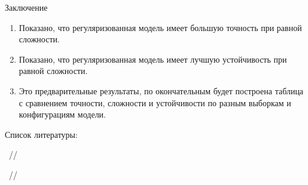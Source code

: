 \documentclass[9pt,pdf,hyperref={unicode}]{beamer}
\begin{document}
\begin{frame}{Заключение}

    \begin{enumerate}
           \item 
        Показано, что регуляризованная модель имеет большую точность при равной сложности.
        \item 
        Показано, что регуляризованная модель имеет лучшую устойчивость при равной сложности.
        \item 
        Это предварительные результаты, по окончательным будет построена таблица с сравнением точности, сложности и устойчивости по разным выборкам и конфигурациям модели.
    \end{enumerate}
Список литературы:
\begin{thebibliography}{1}
			
			~//
			
			
			~//
			
			
		\end{thebibliography}

\end{frame}
\end{document}
